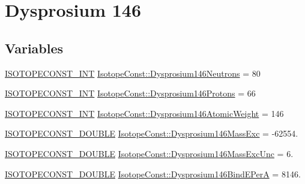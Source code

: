 \hypertarget{group___isotope_const-_dysprosium-_dy146}{}\section{Dysprosium 146}
\label{group___isotope_const-_dysprosium-_dy146}
\subsection*{Variables}
\begin{DoxyCompactItemize}
\item 
\mbox{\hyperlink{group___isotope_const-_macros_ga5f18360b3e99483a35c32d789e62621c}{I\+S\+O\+T\+O\+P\+E\+C\+O\+N\+S\+T\+\_\+\+I\+NT}} \mbox{\hyperlink{group___isotope_const-_dysprosium-_dy146_ga5961f545e27fb69236c35eaa789cf016}{Isotope\+Const\+::\+Dysprosium146\+Neutrons}} = 80
\item 
\mbox{\hyperlink{group___isotope_const-_macros_ga5f18360b3e99483a35c32d789e62621c}{I\+S\+O\+T\+O\+P\+E\+C\+O\+N\+S\+T\+\_\+\+I\+NT}} \mbox{\hyperlink{group___isotope_const-_dysprosium-_dy146_ga18b5471946d9e60d741de877513e633d}{Isotope\+Const\+::\+Dysprosium146\+Protons}} = 66
\item 
\mbox{\hyperlink{group___isotope_const-_macros_ga5f18360b3e99483a35c32d789e62621c}{I\+S\+O\+T\+O\+P\+E\+C\+O\+N\+S\+T\+\_\+\+I\+NT}} \mbox{\hyperlink{group___isotope_const-_dysprosium-_dy146_ga3c3f0e6e69e2ddefc9f4a045946554bf}{Isotope\+Const\+::\+Dysprosium146\+Atomic\+Weight}} = 146
\item 
\mbox{\hyperlink{group___isotope_const-_macros_ga8f45a7272ce02c0b4c65c44636ed719a}{I\+S\+O\+T\+O\+P\+E\+C\+O\+N\+S\+T\+\_\+\+D\+O\+U\+B\+LE}} \mbox{\hyperlink{group___isotope_const-_dysprosium-_dy146_ga44a482c1904fe6fb14463b3e7d9d8184}{Isotope\+Const\+::\+Dysprosium146\+Mass\+Exc}} = -\/62554.
\item 
\mbox{\hyperlink{group___isotope_const-_macros_ga8f45a7272ce02c0b4c65c44636ed719a}{I\+S\+O\+T\+O\+P\+E\+C\+O\+N\+S\+T\+\_\+\+D\+O\+U\+B\+LE}} \mbox{\hyperlink{group___isotope_const-_dysprosium-_dy146_ga5af090ce0e49cd6b373751d691953f7b}{Isotope\+Const\+::\+Dysprosium146\+Mass\+Exc\+Unc}} = 6.
\item 
\mbox{\hyperlink{group___isotope_const-_macros_ga8f45a7272ce02c0b4c65c44636ed719a}{I\+S\+O\+T\+O\+P\+E\+C\+O\+N\+S\+T\+\_\+\+D\+O\+U\+B\+LE}} \mbox{\hyperlink{group___isotope_const-_dysprosium-_dy146_ga13e9434b1deb0b993b77c0868c1e2822}{Isotope\+Const\+::\+Dysprosium146\+Bind\+E\+PerA}} = 8146.

\end{DoxyCompactItemize}
